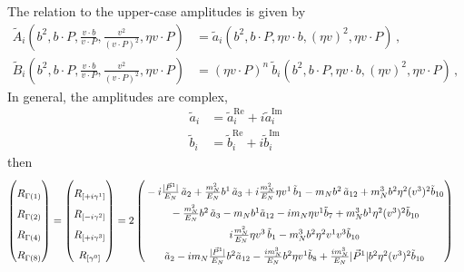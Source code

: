 \documentclass[]{article}
\numberwithin{equation}{section}
\newcommand{\tcdot}{{\cdot}}
\newcommand{\tAmp}{\widetilde{A}}
\newcommand{\tBmp}{\widetilde{B}}
\newcommand{\bvec}{b}
\newcommand{\mN}{m_N}
\begin{document}
The relation to the upper-case amplitudes is given by
\begin{align}
	\tAmp_i\left(\bvec^2,\bvec \tcdot P,\frac{v \tcdot \bvec}{v \tcdot P}, \frac{v^2}{(v \tcdot P)^2}, \eta v \tcdot P\right) & = \tilde a_i(\bvec^2,\bvec \tcdot P, \eta v \tcdot b, (\eta v)^2, \eta v \tcdot P)    \, , \nonumber \\
	 \tBmp_i\left(\bvec^2,\bvec \tcdot P,\frac{v \tcdot \bvec}{v \tcdot P}, \frac{v^2}{(v \tcdot P)^2}, \eta v \tcdot P\right) & = (\eta v \tcdot P)^n\ \tilde b_i(\bvec^2,\bvec \tcdot P, \eta v \tcdot b, (\eta v)^2, \eta v \tcdot P)   \, ,
	\label{eq-ab}
\end{align}
In general, the amplitudes are complex,
\begin{align}
    \tilde{a}_i&=\tilde{a}^{\text{Re}}_i+i\tilde{a}^{\text{Im}}_i\\
    \tilde{b}_i&=\tilde{b}^{\text{Re}}_i+i\tilde{b}^{\text{Im}}_i
\end{align}
then
\begin{align}
    \begin{pmatrix}
        \rule{0pt}{16pt} R_{\Gamma(1)}\\
        \rule{0pt}{16pt} R_{\Gamma(2)}\\
        \rule{0pt}{16pt} R_{\Gamma(4)}\\
        \rule{0pt}{16pt} R_{\Gamma(8)}
    \end{pmatrix} = \begin{pmatrix}
        \rule{0pt}{16pt} R_{[+i\gamma^1]}\\
        \rule{0pt}{16pt} R_{[-i\gamma^2]}\\
        \rule{0pt}{16pt} R_{[+i\gamma^3]}\\
        \rule{0pt}{16pt} R_{[\gamma^0]}
    \end{pmatrix} &=2\begin{pmatrix}
        \rule{0pt}{16pt} -i\frac{|\vec{P}^1|}{E_N}\, \tilde a_2+  \frac{\mN^2}{E_N} \bvec^1\, \tilde a_3+ i\frac{\mN^2}{E_N} \eta v^1\, \tilde b_1 
		-  \mN  \bvec^2 \, \tilde a_{12}+  \mN^3  \bvec^2 \eta^2 (v^3)^2 \tilde b_{10}\\
         \rule{0pt}{16pt} -  \frac{\mN^2}{E_N} \bvec^2\, \tilde a_3
		-  \mN   \bvec^1  \tilde a_{12}-i \mN \eta  v^1  \tilde b_7+ \mN^3  \bvec^1 \eta^2 (v^3)^2 \tilde b_{10}\\
        \rule{0pt}{16pt} i\frac{\mN^2}{E_N} \eta v^3\, \tilde b_1-  \mN^3 \bvec^2 \eta^2 v^1 v^3\tilde b_{10}\\
         \rule{0pt}{16pt}   \tilde a_2  - i \mN  \frac{|\vec{P}^1|}{E_N} \bvec^2  \tilde a_{12}- \frac{ i \mN^3}{E_N}  \bvec^2 \eta v^1  \tilde b_8+ \frac{i \mN^3}{E_N}  |\vec{P}^1| \bvec^2 \eta^2 (v^3)^2 \tilde b_{10}
    \end{pmatrix}
\end{align}
\end{document}
